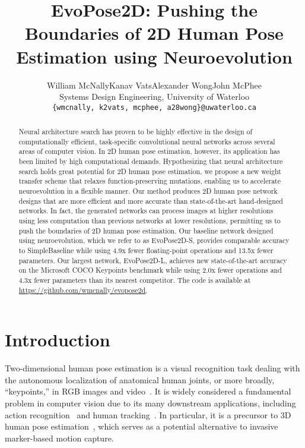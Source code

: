 \documentclass[final]{cvpr}
\begin{document}
\title{EvoPose2D: Pushing the Boundaries of 2D Human Pose Estimation using Neuroevolution}

\author{William McNally\quad\quad Kanav Vats\quad\quad Alexander Wong\quad\quad John McPhee\\
Systems Design Engineering, University of Waterloo\\
{\tt\small \{wmcnally, k2vats, mcphee, a28wong\}@uwaterloo.ca}
}

\maketitle


\begin{abstract}
Neural architecture search has proven to be highly effective in the design of computationally efficient, task-specific convolutional neural networks across several areas of computer vision. In 2D human pose estimation, however, its application has been limited by high computational demands. Hypothesizing that neural architecture search holds great potential for 2D human pose estimation, we propose a new weight transfer scheme that relaxes function-preserving mutations, enabling us to accelerate neuroevolution in a flexible manner. Our method produces 2D human pose network designs that are more efficient and more accurate than state-of-the-art hand-designed networks. In fact, the generated networks can process images at higher resolutions using less computation than previous networks at lower resolutions, permitting us to push the boundaries of 2D human pose estimation. Our baseline network designed using neuroevolution, which we refer to as EvoPose2D-S, provides comparable accuracy to SimpleBaseline while using 4.9x fewer floating-point operations and 13.5x fewer parameters. Our largest network, EvoPose2D-L, achieves new state-of-the-art accuracy on the Microsoft COCO Keypoints benchmark while using 2.0x fewer operations and 4.3x fewer parameters than its nearest competitor. The code is available at \href{https://github.com/wmcnally/evopose2d}{https://github.com/wmcnally/evopose2d}.



\end{abstract}

\section{Introduction}
Two-dimensional human pose estimation is a visual recognition task dealing with the autonomous localization of anatomical human joints, or more broadly, ``keypoints,'' in RGB images and video~\cite{toshev2014deeppose, tompson2014joint, andriluka20142d}. It is widely considered a fundamental problem in computer vision due to its many downstream applications, including action recognition~\cite{cheron2015p, mcnally2019star} and human tracking~\cite{insafutdinov2017arttrack, andriluka2018posetrack, xiao2018simple}. In particular, it is a precursor to 3D human pose estimation~\cite{martinez2017simple, pavllo20193d}, which serves as a potential alternative to invasive marker-based motion capture. 
\end{document}
